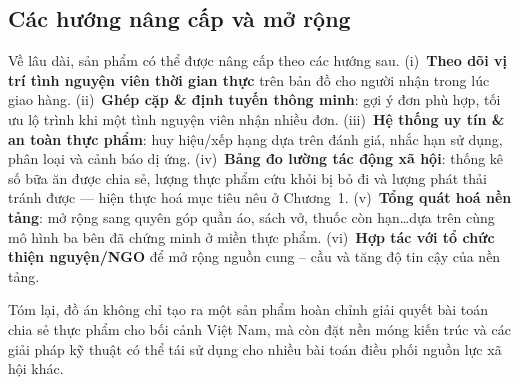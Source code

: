 \documentclass[../main.tex]{subfiles}%
\begin{document}
\subsection{Các hướng nâng cấp và mở rộng}
\label{subsection:6.2.2}

Về lâu dài, sản phẩm có thể được nâng cấp theo các hướng sau. (i)~\textbf{Theo dõi vị trí tình nguyện viên thời gian thực} trên bản đồ cho người nhận trong lúc giao hàng. (ii)~\textbf{Ghép cặp \& định tuyến thông minh}: gợi ý đơn phù hợp, tối ưu lộ trình khi một tình nguyện viên nhận nhiều đơn. (iii)~\textbf{Hệ thống uy tín \& an toàn thực phẩm}: huy hiệu/xếp hạng dựa trên đánh giá, nhắc hạn sử dụng, phân loại và cảnh báo dị ứng. (iv)~\textbf{Bảng đo lường tác động xã hội}: thống kê số bữa ăn được chia sẻ, lượng thực phẩm cứu khỏi bị bỏ đi và lượng phát thải tránh được --- hiện thực hoá mục tiêu nêu ở Chương~1. (v)~\textbf{Tổng quát hoá nền tảng}: mở rộng sang quyên góp quần áo, sách vở, thuốc còn hạn\ldots dựa trên cùng mô hình ba bên đã chứng minh ở miền thực phẩm. (vi)~\textbf{Hợp tác với tổ chức thiện nguyện/NGO} để mở rộng nguồn cung -- cầu và tăng độ tin cậy của nền tảng.

Tóm lại, đồ án không chỉ tạo ra một sản phẩm hoàn chỉnh giải quyết bài toán chia sẻ thực phẩm cho bối cảnh Việt Nam, mà còn đặt nền móng kiến trúc và các giải pháp kỹ thuật có thể tái sử dụng cho nhiều bài toán điều phối nguồn lực xã hội khác.

\ifSubfilesClassLoaded{\printbibliography{}}{}
\end{document}
